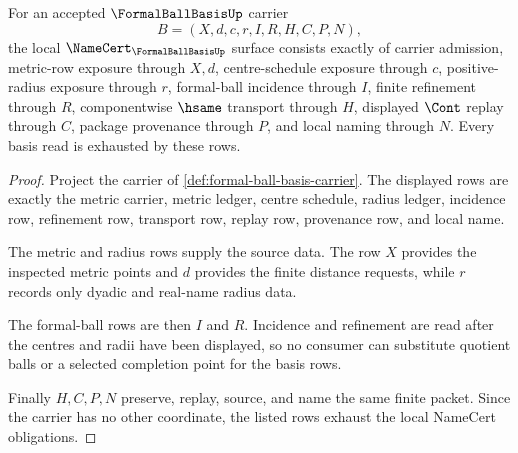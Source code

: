 \begin{theorem}
\label{thm:formal-ball-basis-namecert-obligations}
For an accepted $\FormalBallBasisUp$ carrier
$$
B=(X,d,c,r,I,R,H,C,P,N),
$$
the local $\NameCert_{\FormalBallBasisUp}$ surface consists exactly of carrier admission, metric-row exposure through $X,d$, centre-schedule exposure through $c$, positive-radius exposure through $r$, formal-ball incidence through $I$, finite refinement through $R$, componentwise $\hsame$ transport through $H$, displayed $\Cont$ replay through $C$, package provenance through $P$, and local naming through $N$. Every basis read is exhausted by these rows.
\end{theorem}
\begin{proof}
Project the carrier of \autoref{def:formal-ball-basis-carrier}. The displayed rows are exactly the metric carrier, metric ledger, centre schedule, radius ledger, incidence row, refinement row, transport row, replay row, provenance row, and local name.

The metric and radius rows supply the source data. The row $X$ provides the inspected metric points and $d$ provides the finite distance requests, while $r$ records only dyadic and real-name radius data.

The formal-ball rows are then $I$ and $R$. Incidence and refinement are read after the centres and radii have been displayed, so no consumer can substitute quotient balls or a selected completion point for the basis rows.

Finally $H,C,P,N$ preserve, replay, source, and name the same finite packet. Since the carrier has no other coordinate, the listed rows exhaust the local NameCert obligations.
\end{proof}

